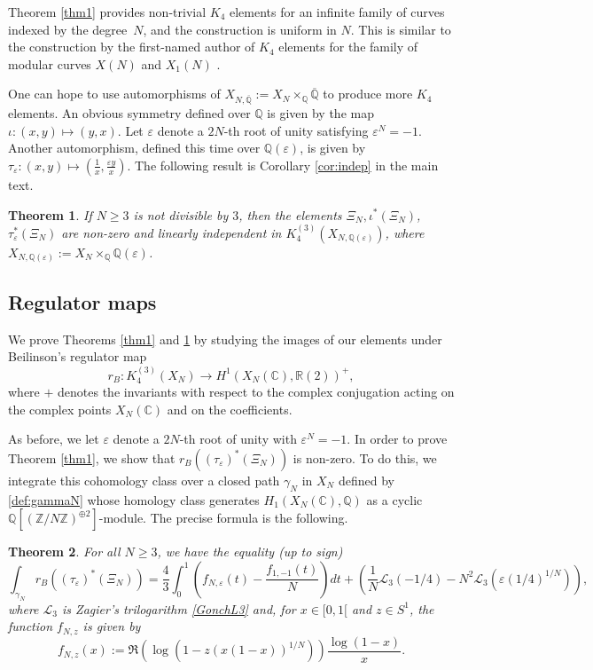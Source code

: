\documentclass[11pt,a4,leqno]{amsart}
\theoremstyle{my theoremstyle}
\newtheorem{thm}{Theorem}[section]
\theoremstyle{dfn}
\theoremstyle{remark}
\renewcommand{\1}{\mathbbm{1}}
\newcommand{\Z}{\mathbb{Z}}
\newcommand{\Q}{\mathbb{Q}}
\newcommand{\R}{\mathbb{R}}
\newcommand{\C}{\mathbb{C}}
\newcommand{\e}{\varepsilon}
\numberwithin{equation}{section}
\begin{document}
Theorem \ref{thm1} provides non-trivial $K_4$ elements for an infinite family of curves indexed by the degree~$N$, and the construction is uniform in $N$. This is similar to the construction by the first-named author of $K_4$ elements for the family of modular curves $X(N)$ and $X_1(N)$ \cite{Bru20}. 

One can hope to use automorphisms of $X_{N, \overline{\Q}}:=X_N  \times_{\Q} \overline{\Q}$ to produce more $K_4$ elements. An obvious symmetry defined over $\Q$ is given by the map
$
    \iota \colon (x,y) \mapsto (y, x).
$
Let $\e$ denote a $2N$-th root of unity satisfying $\e^N=-1$. Another automorphism, defined this time over $\Q(\e)$, is given by 
$
\tau_\e \colon (x,y) \mapsto \left(\frac{1}{x}, \frac{\varepsilon y}{x} \right).
$
The following result is Corollary \ref{cor:indep} in the main text. 

\begin{thm}\label{thm2}
    If $N\geq 3$ is not divisible by $3$, then the elements $\Xi_N, \iota^*(\Xi_N)$, $\tau_{\e}^*(\Xi_N)$ are non-zero and linearly independent in $K_4^{(3)}(X_{N,\Q(\e)})$, where $X_{N,\Q(\e)}:=X_N  \times_{\Q} \Q(\e)$.
\end{thm}

\subsection{Regulator maps}

We prove Theorems \ref{thm1} and \ref{thm2} by studying the images of our elements under Beilinson's regulator map \cite{Bei80,Nek94}
\begin{equation*}
    r_B : K_4^{(3)}(X_N) \longrightarrow H^1(X_N(\C), \R(2))^+,
\end{equation*}
where $+$ denotes the invariants with respect to the complex conjugation acting on the complex points $X_N(\C)$ and on the coefficients. 

As before, we let $\e$ denote a $2N$-th root of unity with $\e^N=-1$. 
In order to prove Theorem \ref{thm1}, we show that $r_B ((\tau_\e)^*(\Xi_N))$ is non-zero. To do this, we integrate this cohomology class over a closed path $\gamma_N$ in $X_N$ defined by \eqref{def:gammaN} whose homology class generates $H_1(X_N(\C),\Q)$ as a cyclic $\Q[(\Z/N\Z)^{\oplus 2}]$-module. The precise formula is the following. 

\begin{thm}\label{thm3}
     For all $N\geq 3$, we have the equality (up to sign)
    \begin{equation*}
    \int_{\gamma_N} r_B ((\tau_\e)^*(\Xi_N))=\frac43  \int_0^1 \left(f_{N, \e}(t) - \frac{f_{1,-1}(t)}{N}\right) dt
      + \left(\frac1N \mathcal{L}_3(-1/4)-N^2 \mathcal{L}_3(\e (1/4)^{1/N})\right),
\end{equation*}
where $\mathcal{L}_3$ is Zagier's trilogarithm \eqref{GonchL3} and, for $x\in [0,1[$ and $z\in S^1$, the function $f_{N, z}$ is given by
\begin{equation*}
    f_{N,z}(x):=\Re(\log(1- z (x(1-x))^{1/N})) \frac{\log(1-x)}{x}.
\end{equation*}
\end{thm}
\end{document}
